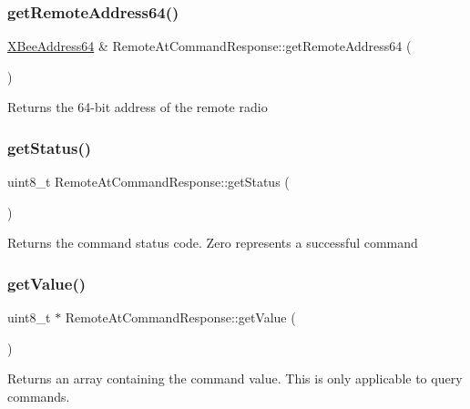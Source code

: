 \subsubsection{\texorpdfstring{get\+Remote\+Address64()}{getRemoteAddress64()}}
{\footnotesize\ttfamily \hyperlink{class_x_bee_address64}{X\+Bee\+Address64} \& Remote\+At\+Command\+Response\+::get\+Remote\+Address64 (\begin{DoxyParamCaption}{ }\end{DoxyParamCaption})}

Returns the 64-\/bit address of the remote radio \hypertarget{class_remote_at_command_response_afc1b15612ea780c10dc1f33754868548}{}\label{class_remote_at_command_response_afc1b15612ea780c10dc1f33754868548} 
\subsubsection{\texorpdfstring{get\+Status()}{getStatus()}}
{\footnotesize\ttfamily uint8\+\_\+t Remote\+At\+Command\+Response\+::get\+Status (\begin{DoxyParamCaption}{ }\end{DoxyParamCaption})}

Returns the command status code. Zero represents a successful command \hypertarget{class_remote_at_command_response_a3d72d768131c63271a62f75530efda29}{}\label{class_remote_at_command_response_a3d72d768131c63271a62f75530efda29} 
\subsubsection{\texorpdfstring{get\+Value()}{getValue()}}
{\footnotesize\ttfamily uint8\+\_\+t $\ast$ Remote\+At\+Command\+Response\+::get\+Value (\begin{DoxyParamCaption}{ }\end{DoxyParamCaption})}

Returns an array containing the command value. This is only applicable to query commands. \hypertarget{class_remote_at_command_response_a55cf17381e461b8de4a2d5459bfc964a}{}\label{class_remote_at_command_response_a55cf17381e461b8de4a2d5459bfc964a} 
